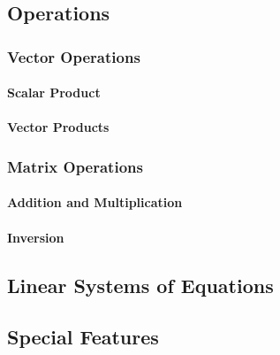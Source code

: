 \subsection{Operations}

\subsubsection{Vector Operations}
\paragraph{Scalar Product}
\paragraph{Vector Products}

\subsubsection{Matrix Operations}
\paragraph{Addition and Multiplication}
\paragraph{Inversion}


\subsection{Linear Systems of Equations}




\subsection{Special Features}


